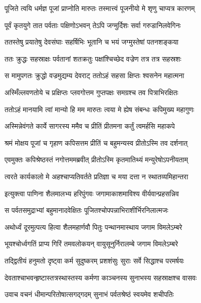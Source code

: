 \twolineshloka
{पूजिते त्वयि धर्मज्ञ पूजां प्राप्नोति मारुतः}
{तस्मात्त्वं पूजनीयो मे शृणु चाप्यत्र कारणम्} %

\twolineshloka
{पूर्वं कृतयुगे तात पर्वताः पक्षिणोऽभवन्}
{तेऽपि जग्मुर्दिशः सर्वा गरुडानिलवेगिनः} %

\twolineshloka
{ततस्तेषु प्रयातेषु देवसंघाः सहर्षिभिः}
{भूतानि च भयं जग्मुस्तेषां पतनशङ्कया} %

\twolineshloka
{ततः क्रुद्धः सहस्राक्षः पर्वतानां शतक्रतुः}
{पक्षांश्चिच्छेद वज्रेण तत्र तत्र सहस्रशः} %

\twolineshloka
{स मामुपगतः क्रुद्धो वज्रमुद्यम्य देवराट्}
{ततोऽहं सहसा क्षिप्तः श्वसनेन महात्मना} %

\twolineshloka
{अस्मिँल्लवणतोये च प्रक्षिप्तः प्लवगोत्तम}
{गुप्तपक्षः समग्रश्च तव पित्राभिरक्षितः} %

\twolineshloka
{ततोऽहं मानयामि त्वां मान्यो हि मम मारुतः}
{त्वया मे ह्येष संबन्धः कपिमुख्य महागुणः} %

\twolineshloka
{अस्मिन्नेवंगते कार्ये सागरस्य ममैव च}
{प्रीतिं प्रीतमना कर्तुं त्वमर्हसि महाकपे} %

\twolineshloka
{श्रमं मोक्षय पूजां च गृहाण कपिसत्तम}
{प्रीतिं च बहुमन्यस्व प्रीतोऽस्मि तव दर्शनात्} %

\twolineshloka
{एवमुक्तः कपिश्रेष्ठस्तं नगोत्तममब्रवीत्}
{प्रीतोऽस्मि कृतमातिथ्यं मन्युरेषोऽपनीयताम्} %

\twolineshloka
{त्वरते कार्यकालो मे अहश्चाप्यतिवर्तते}
{प्रतिज्ञा च मया दत्ता न स्थातव्यमिहान्तरा} %

\twolineshloka
{इत्युक्त्वा पाणिना शैलमालभ्य हरिपुंगवः}
{जगामाकाशमाविश्य वीर्यवान्प्रहसन्निव} %

\twolineshloka
{स पर्वतसमुद्राभ्यां बहुमानादवेक्षितः}
{पूजितश्चोपपन्नाभिराशीर्भिरनिलात्मजः} %

\twolineshloka
{अथोर्ध्वं दूरमुत्पत्य हित्वा शैलमहार्णवौ}
{पितुः पन्थानमास्थाय जगाम विमलेऽम्बरे} %

\twolineshloka
{भूयश्चोर्ध्वगतिं प्राप्य गिरिं तमवलोकयन्}
{वायुसूनुर्निरालम्बे जगाम विमलेऽम्बरे} %

\twolineshloka
{तद्द्वितीयं हनुमतो दृष्ट्वा कर्म सुदुष्करम्}
{प्रशशंसुः सुराः सर्वे सिद्धाश्च परमर्षयः} %

\twolineshloka
{देवताश्चाभवन्हृष्टास्तत्रस्थास्तस्य कर्मणा}
{काञ्चनस्य सुनाभस्य सहस्राक्षश्च वासवः} %

\twolineshloka
{उवाच वचनं धीमान्परितोषात्सगद्गदम्}
{सुनाभं पर्वतश्रेष्ठं स्वयमेव शचीपतिः} %

